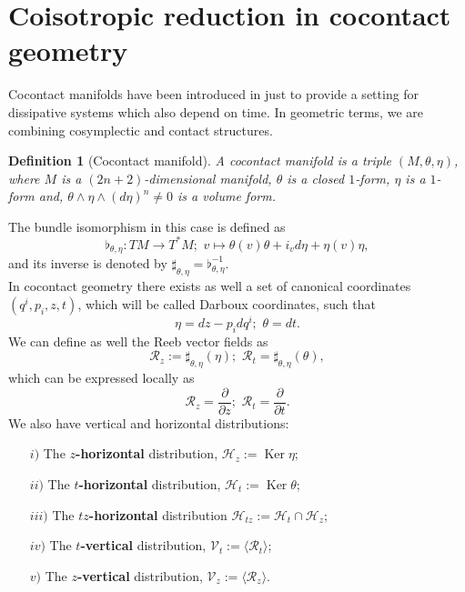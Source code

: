 \documentclass[12pt]{article}
\newtheorem{Def}{Definition}[section]
\renewcommand{\ker}{\operatorname{Ker}}
\newcommand{\sectiontitle}{section}
\newcommand{\setsectiontitle}[1]{\renewcommand{\sectiontitle}{\footnotesize\textit{#1}}}
\newcommand{\partder}[2]{\frac{\partial #1}{\partial #2}}
\begin{document}
\section{Coisotropic reduction in cocontact geometry}\label{Cocontact}
\setsectiontitle{COISOTROPIC REDUCTION IN COCONTACT GEOMETRY}

Cocontact manifolds have been introduced in \cites{de2022time} just to provide a setting for dissipative systems which also depend on time. In geometric terms, we are combining cosymplectic and contact structures.\\


\begin{Def}[Cocontact manifold] A cocontact manifold is a triple $(M,\theta, \eta)$, where $M$ is a $(2n + 2)$-dimensional manifold, $\theta$ is a closed $1$-form, $\eta$ is a $1$-form  and, $\theta \wedge \eta \wedge (d\eta)^n \neq 0$ is a volume form.
\end{Def}

The bundle isomorphism in this case is defined as $$ \flat_{\theta, \eta}: TM \rightarrow T^*M;\,\, v \mapsto \theta(v)\theta + i_{v}d\eta + \eta(v) \eta,$$ and its inverse is denoted by $\sharp_{\theta,\eta} = \flat_{\theta,\eta}^{-1}.$\\

In cocontact geometry there exists as well a set of canonical coordinates $(q^i,p_i,z,t)$, which will be called Darboux coordinates, such that $$\eta = dz - p_i dq^i; \,\, \theta = dt.$$ We can define as well the Reeb vector fields as $$\mathcal{R}_z:= \sharp_{\theta, \eta}(\eta); \,\, \mathcal{R}_t = \sharp_{\theta, \eta}(\theta),$$ which can be expressed locally as $$\mathcal{R}_z = \partder{}{z}; \,\, \mathcal{R}_t = \partder{}{t}.$$ We also have vertical and horizontal distributions:
\begin{itemize}
    \item[$i)$] The \textbf{$z$-horizontal} distribution, $\mathcal{H}_z := \ker \eta$;
    \item[$ii)$] The \textbf{$t$-horizontal} distribution, $\mathcal{H}_t := \ker \theta$;
    \item[$iii)$] The \textbf{$tz$-horizontal} distribution $\mathcal{H}_{tz} := \mathcal{H}_t \cap \mathcal{H}_z$;
    \item[$iv)$] The \textbf{$t$-vertical} distribution, $\mathcal{V}_t := \langle \mathcal{R}_t \rangle$;
    \item[$v)$] The \textbf{$z$-vertical} distribution, $\mathcal{V}_z := \langle \mathcal{R}_z \rangle.$
\end{itemize}
\end{document}
